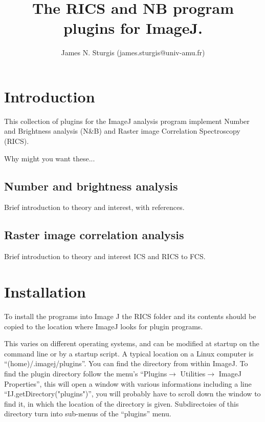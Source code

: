 \documentclass[10pt]{article}
\begin{document}
\author{James N. Sturgis (james.sturgis@univ-amu.fr)}
\title{The RICS and NB program plugins for ImageJ.}

\maketitle

\section{Introduction}

This collection of plugins for the ImageJ analysis program implement Number and
Brightness analysis (N\&B) and Raster image Correlation Spectroscopy (RICS).

Why might you want these...

\subsection{Number and brightness analysis}

Brief introduction to theory and interest, with references.

\subsection{Raster image correlation analysis}

Brief introduction to theory and interest ICS and RICS to FCS.

\section{Installation}

To install the programs into Image J the RICS folder and its contents should 
be copied to the location where ImageJ looks for plugin programs. 

This varies on different operating systems, and can be modified at startup 
on the command line or by a startup script. 
A typical location on a Linux computer is ``(home)/.imagej/plugins''.
You can find the directory from within ImageJ. To find the plugin directory
follow the menu's ``Plugins$\rightarrow $ Utilities$\rightarrow $ ImageJ Properties'',
this will open a window with various informations including a line ``IJ.getDirectory("plugins")'',
you will probably have to scroll down the window to find it, in which the location of
the directory is given. Subdirectoies of this directory turn into sub-menus of the
``plugins'' menu.
\end{document}

